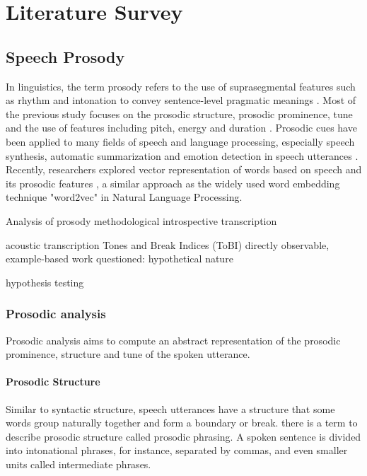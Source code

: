 \chapter{Literature Survey}



\section{Speech Prosody}
In linguistics, the term prosody refers to the use of suprasegmental features such as rhythm and intonation to convey sentence-level pragmatic meanings \citep{Jurafsky2008}. Most of the previous study focuses on the prosodic structure, prosodic prominence, tune and the use of features including pitch, energy and duration \citep{Pierrehumbert1980,Pierrehumbert1990,Pierrehumbert2015,Hirschberg2002}. Prosodic cues have been applied to many fields of speech and language processing, especially speech synthesis, automatic summarization and emotion detection in speech utterances \citep{Hong2015}. Recently, researchers explored vector representation of words based on speech and its prosodic features \citep{He2016, Chung2018}, a similar approach as the widely used word embedding technique "word2vec" in Natural Language Processing.     

Analysis of prosody
methodological 
introspective transcription

acoustic transcription
Tones and Break Indices (ToBI) 
directly observable,
example-based work
questioned: hypothetical nature

hypothesis testing

\subsection{Prosodic analysis}
Prosodic analysis aims to compute an abstract representation of the prosodic prominence, structure and tune of the spoken utterance.

\subsubsection{Prosodic Structure}
Similar to syntactic structure, speech utterances have a structure that some words group naturally together and form a boundary or break. there is a term to describe prosodic structure called prosodic phrasing. A spoken sentence is divided into intonational phrases, for instance, separated by commas, and even smaller units called intermediate phrases. 


